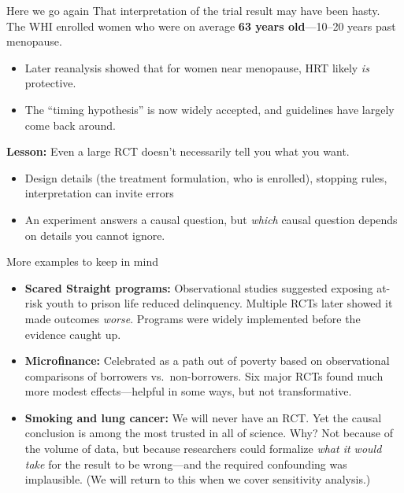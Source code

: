 \documentclass[xcolor=dvipsnames]{beamer}
\newcommand\makebiggaps{\addtolength{\itemsep}{.5\baselineskip}}
\begin{document}
\begin{frame}{Here we go again}
 That interpretation of the trial result may have been hasty.\\
\bigskip
{} The WHI enrolled women who were on average \textbf{63 years old}---10--20 years past menopause.\\

\begin{itemize}
\item Later reanalysis showed that for women near menopause, HRT likely \textit{is} protective. 
\item The ``timing hypothesis'' is now widely accepted, and guidelines have largely come back around.\\
\end{itemize}
\bigskip
{} \textbf{Lesson:} Even a large RCT doesn't necessarily tell you what you want.\\

\begin{itemize}
 \item<5-> Design details (the treatment formulation, who is enrolled), stopping rules, interpretation can invite errors
 \item<6-> An experiment answers a causal question, but \textit{which} causal question depends on details you cannot ignore.
 \end{itemize}
\end{frame}

\begin{frame}{More examples to keep in mind}
\small
\begin{itemize}
\makebiggaps
\item<1-> \textbf{Scared Straight programs:} Observational studies suggested exposing at-risk youth to prison life reduced delinquency. Multiple RCTs later showed it made outcomes \textit{worse}. Programs were widely implemented before the evidence caught up.
\medskip
\item<2-> \textbf{Microfinance:} Celebrated as a path out of poverty based on observational comparisons of borrowers vs.\ non-borrowers. Six major RCTs found much more modest effects---helpful in some ways, but not transformative.
\medskip
\item<3-> \textbf{Smoking and lung cancer:} We will never have an RCT. Yet the causal conclusion is among the most trusted in all of science. Why? Not because of the volume of data, but because researchers could formalize \textit{what it would take} for the result to be wrong---and the required confounding was implausible. (We will return to this when we cover sensitivity analysis.)
\end{itemize}
\end{frame}
\end{document}
